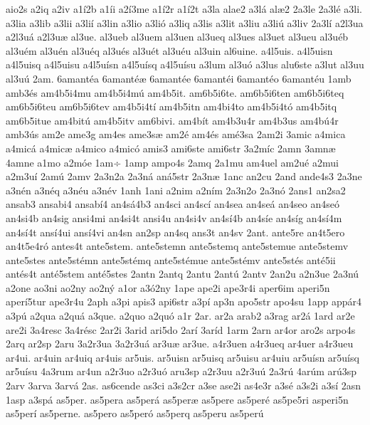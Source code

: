 {aio2s
a2iq
a2iv
a1^^ed2b
a1^^edi
a2^^ed3me
a1^^ed2r
a1^^ed2t
a3la
alae2
a3l^^e1
al^^e62
2a3le
2a3l^^e9
a3li.
a3lia
a3lib
a3lii
a3li^^ed
a3lin
a3lio
a3li^^f3
a3liq
a3lis
a3lit
a3liu
a3li^^fa
a3liv
2a3l^^ed
a2l3ua
a2l3u^^e1
a2l3u^^e6
al3ue.
al3ueb
al3uem
al3uen
al3ueq
al3ues
al3uet
al3ueu
al3u^^e9b
al3u^^e9m
al3u^^e9n
al3u^^e9q
al3u^^e9s
al3u^^e9t
al3u^^e9u
al3uin
al6uine.
a4l5uis.
a4l5uisn
a4l5uisq
a4l5uisu
a4l5u^^edsn
a4l5u^^edsq
a4l5u^^edsu
a3lum
al3u^^f3
a3lus
alu6ste
a3lut
al3uu
al3u^^fa
2am.
6amant^^e9a
6amant^^e9^^e6
6amant^^e9e
6amant^^e9i
6amant^^e9o
6amant^^e9u
1amb
amb3^^e9s
am4b5i4mu
am4b5i4m^^fa
am4b5it.
am6b5i6te.
am6b5i6ten
am6b5i6teq
am6b5i6teu
am6b5i6tev
am4b5i4t^^ed
am4b5itn
am4bi4to
am4b5i4t^^f3
am4b5itq
am6b5itue
am4bit^^fa
am4b5itv
am6bivi.
am4b^^edt
am4b3u4r
am4b3us
am4b^^fa4r
amb3^^fas
am2e
ame3g
am4es
ame3s^^e6
am2^^e9
am4^^e9s
am^^e93sa
2am2i
3amic
a4mica
a4mic^^e1
a4mic^^e6
a4mico
a4mic^^f3
amis3
ami6ste
ami6str
3a2m^^edc
2amn
3amn^^e6
4amne
a1mo
a2m^^f3e
1am^^f7
1amp
ampo4s
2amq
2a1mu
am4uel
am2u^^e9
a2mui
a2m3u^^ed
2am^^fa
2amv
2a3n2a
2a3n^^e1
an^^e15str
2a3n^^e6
1anc
an2cu
2and
ande4s3
2a3ne
a3n^^e9n
a3n^^e9q
a3n^^e9u
a3n^^e9v
1anh
1ani
a2nim
a2n^^edm
2a3n2o
2a3n^^f3
2ans1
an2sa2
ansab3
ansabi4
ansab^^ed4
an4s^^e14b3
an4sci
an4sc^^ed
an4sea
an4se^^e1
an4seo
an4se^^f3
an4si4b
an4sig
ansi4mi
an4si4t
ansi4u
an4si4v
an4s^^ed4b
an4s^^ede
an4s^^edg
an4s^^ed4m
an4s^^ed4t
ans^^ed4ui
ans^^ed4vi
an4sn
an2sp
an4sq
ans3t
an4sv
2ant.
ante5re
an4t5ero
an4t5e4r^^f3
antes4t
ante5stem.
ante5stemn
ante5stemq
ante5stemue
ante5stemv
ante5stes
ante5st^^e9mn
ante5st^^e9mq
ante5st^^e9mue
ante5st^^e9mv
ante5st^^e9s
ant^^e95ii
ant^^e9s4t
ant^^e95stem
ant^^e95stes
2antn
2antq
2antu
2ant^^fa
2antv
2an2u
a2n3ue
2a3n^^fa
a2one
ao3ni
ao2ny
ao2n^^fd
a1or
a3^^f32ny
1ape
ape2i
ape3r4i
aper6im
aperi5n
aper^^ed5tur
ape3r4u
2aph
a3pi
apis3
api6str
a3p^^ed
ap3n
apo5str
apo4su
1app
app^^e1r4
a3p^^fa
a2qua
a2qu^^e1
a3que.
a2quo
a2qu^^f3
a1r
2ar.
ar2a
arab2
a3rag
ar2^^e1
1ard
ar2e
are2i
3a4resc
3a4r^^e9sc
2ar2i
3arid
ari5do
2ar^^ed
3ar^^edd
1arm
2arn
ar4or
aro2s
arpo4s
2arq
ar2sp
2aru
3a2r3ua
3a2r3u^^e1
ar3u^^e6
ar3ue.
a4r3uen
a4r3ueq
ar4uer
a4r3ueu
ar4ui.
ar4uin
ar4uiq
ar4uis
ar5uis.
ar5uisn
ar5uisq
ar5uisu
ar4uiu
ar5u^^edsn
ar5u^^edsq
ar5u^^edsu
4a3rum
ar4un
a2r3uo
a2r3u^^f3
aru3sp
a2r3uu
a2r3u^^fa
2a3r^^fa
4ar^^fam
ar^^fa3sp
2arv
3arva
3arv^^e1
2as.
as6cende
as3ci
a3s2cr
a3se
ase2i
as4e3r
a3s^^e9
a3s2i
a3s^^ed
2asn
1asp
a3sp^^e1
as5per.
as5pera
as5per^^e1
as5per^^e6
as5pere
as5per^^e9
as5pe5ri
asperi5n
as5per^^ed
as5perne.
as5pero
as5per^^f3
as5perq
as5peru
as5per^^fa
}
